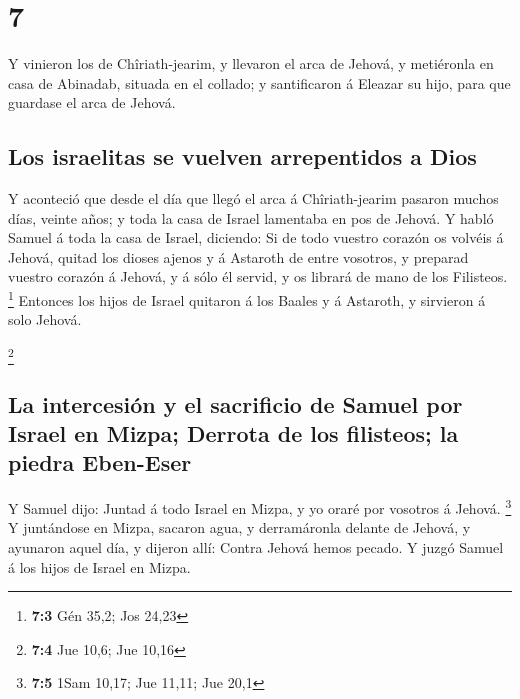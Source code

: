 \hypertarget{section-6}{%
\section{7}\label{section-6}}

 Y vinieron los de Chîriath-jearim, y llevaron el arca de
Jehová, y metiéronla en casa de Abinadab, situada en el collado; y
santificaron á Eleazar su hijo, para que guardase el arca de Jehová.

\hypertarget{los-israelitas-se-vuelven-arrepentidos-a-dios}{%
\subsection{Los israelitas se vuelven arrepentidos a
Dios}\label{los-israelitas-se-vuelven-arrepentidos-a-dios}}

 Y aconteció que desde el día que llegó el arca á
Chîriath-jearim pasaron muchos días, veinte años; y toda la casa de
Israel lamentaba en pos de Jehová.  Y habló Samuel á toda
la casa de Israel, diciendo: Si de todo vuestro corazón os volvéis á
Jehová, quitad los dioses ajenos y á Astaroth de entre vosotros, y
preparad vuestro corazón á Jehová, y á sólo él servid, y os librará de
mano de los Filisteos. \footnote{\textbf{7:3} Gén 35,2; Jos 24,23}
 Entonces los hijos de Israel quitaron á los Baales y á
Astaroth, y sirvieron á solo Jehová.

\footnote{\textbf{7:4} Jue 10,6; Jue 10,16}

\hypertarget{la-intercesiuxf3n-y-el-sacrificio-de-samuel-por-israel-en-mizpa-derrota-de-los-filisteos-la-piedra-eben-eser}{%
\subsection{La intercesión y el sacrificio de Samuel por Israel en
Mizpa; Derrota de los filisteos; la piedra
Eben-Eser}\label{la-intercesiuxf3n-y-el-sacrificio-de-samuel-por-israel-en-mizpa-derrota-de-los-filisteos-la-piedra-eben-eser}}

 Y Samuel dijo: Juntad á todo Israel en Mizpa, y yo oraré
por vosotros á Jehová. \footnote{\textbf{7:5} 1Sam 10,17; Jue 11,11; Jue
  20,1}  Y juntándose en Mizpa, sacaron agua, y
derramáronla delante de Jehová, y ayunaron aquel día, y dijeron allí:
Contra Jehová hemos pecado. Y juzgó Samuel á los hijos de Israel en
Mizpa.


